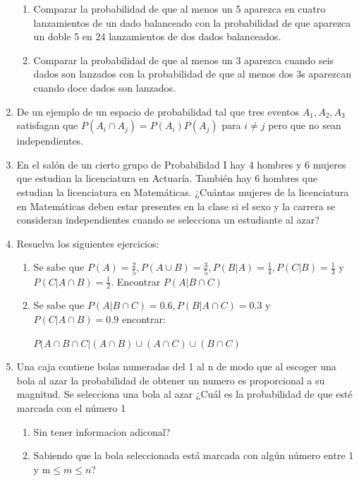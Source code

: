 \documentclass[12pt,a4paper]{report}
\begin{document}
\begin{enumerate}
{\begin{enumerate}[label=\alph*) ]
    \item{Comparar la probabilidad de que al menos un 5 aparezca en cuatro lanzamientos de un dado balanceado con la probabilidad de que aparezca un doble 5 en 24 lanzamientos de dos dados balanceados.} \\
    \item{Comparar la probabilidad de que al menos un 3 aparezca cuando seis dados son lanzados con la probabilidad de que al menos dos 3s aparezcan cuando doce dados son lanzados.}
    \end{enumerate}
	}


   \item {
   De un ejemplo de un espacio de probabilidad tal que tres eventos $A_{1},A_{2},A_{3}$ satisfagan que $P(A_{i}\cap A_{j})=P(A_{i})P(A_{j})$ para $i\neq j$ pero que no sean independientes.\\
	}

   \item {En el salón de un cierto grupo de Probabilidad I hay 4 hombres y 6 mujeres que estudian la licenciatura en Actuaría. También hay 6 hombres que estudian la licenciatura en Matemáticas. ¿Cuántas mujeres de la licenciatura en Matemáticas deben estar presentes en la clase si el sexo y la carrera se consideran independientes cuando se selecciona un estudiante al azar?
	}

  \item{
 Resuelva los siguientes ejercicios:\\
 \begin{enumerate}[label=\alph*) ]
 \item{Se sabe que $P(A)= \frac{2}{5},P(A\cup B)=\frac{3}{5},P(B|A)=\frac{1}{4},P(C|B)=\frac{1}{3}$ y $P(C|A\cap B)=\frac{1}{2}$. Encontrar $P(A|B\cap C)$}\\
 \item{Se sabe que $P(A|B\cap C)=0.6, P(B|A\cap C)=0.3$ y $P(C|A\cap B)=0.9$ encontrar: \\
 \begin{center}
 $P(A\cap B\cap C| (A\cap B) \cup (A\cap C) \cup (B\cap C)$
 \end{center} }
 \end{enumerate}
  }


  \item{
 Una caja contiene bolas numeradas del 1 al n de modo que al escoger una bola al azar la probabilidad de obtener un numero es proporcional a su magnitud. Se selecciona una bola al azar ¿Cuál es la probabilidad de que esté marcada con el número 1\\
 \begin{enumerate}[label= \alph*) ]
 \item{Sin tener informacion adiconal?}\\
 \item{Sabiendo que la bola seleccionada está marcada con algún número entre 1 y m$\leq m \leq n$?}
 \end{enumerate}
  }


\end{enumerate}
\end{document}
